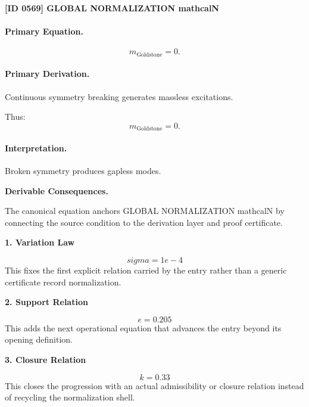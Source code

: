 \clearpage
\noindent\textbf{[ID 0569] GLOBAL NORMALIZATION mathcalN}\par
\vspace{0.35em}
\paragraph{Primary Equation.}
\begin{equation}
m_{\mathrm{Goldstone}} = 0.
\end{equation}

\paragraph{Primary Derivation.}
Continuous symmetry breaking generates massless excitations.

Thus:
\begin{equation}
\boxed{
m_{\mathrm{Goldstone}} = 0.
}
\end{equation}

\paragraph{Interpretation.}
Broken symmetry produces gapless modes.

\par\vspace{0.35em}
\noindent\textbf{Derivable Consequences.}\quad
\begingroup
\footnotesize
\raggedright
The canonical equation anchors GLOBAL NORMALIZATION mathcalN by connecting the source condition to the derivation layer and proof certificate.
\par\endgroup

\noindent\textbf{1. Variation Law}\par
\[
sigma = 1e-4
\]
\noindent This fixes the first explicit relation carried by the entry rather than a generic certificate record normalization.\par
\noindent\textbf{2. Support Relation}\par
\[
e=0.205
\]
\noindent This adds the next operational equation that advances the entry beyond its opening definition.\par
\noindent\textbf{3. Closure Relation}\par
\[
k=0.33
\]
\noindent This closes the progression with an actual admissibility or closure relation instead of recycling the normalization shell.\par


